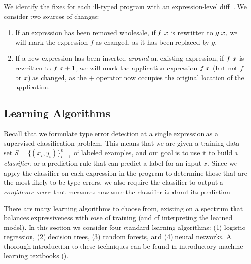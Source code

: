We identify the fixes for each ill-typed program with an
expression-level diff~\citep{Lempsink2009-xf}.
%
We consider two sources of changes:
%
\begin{enumerate}
\item If an expression has been removed wholesale, \eg if $f\ x$
  is rewritten to $g\ x$, we will mark the expression $f$ as
  changed, as it has been replaced by $g$.
\item If a new expression has been inserted \emph{around} an existing
  expression, \eg if $f\ x$ is rewritten to
  $f\ x + 1$, we will mark the application expression
  $f\ x$ (but not $f$ or $x$) as changed, as the $+$ operator now
  occupies the original location of the application.
\end{enumerate}

\subsection{Learning Algorithms}
\label{sec:models}
\lstDeleteShortInline{|} %

Recall that we formulate type error detection at a single expression as a supervised classification problem. This means that we are given a training data set $S = \{ (x_i, y_i) \}_{i=1}^n$ of labeled examples, and our goal is to use it to build a {\em{classifier}}, or a prediction rule that can predict a label for an input $x$. Since we apply the classifier on each expression in the program to determine those that are the most likely to be type errors, we also require the classifier to output a {\em{confidence score}} that measures how sure the classifier is about its prediction. 


%
%

There are many learning algorithms to choose from, existing
on a spectrum that balances expressiveness with ease of training (and of
interpreting the learned model). In this section we consider four standard learning algorithms: (1) logistic regression, (2) decision trees, (3) random forests, and (4) neural networks. A thorough introduction to these techniques can be found in introductory
machine learning textbooks (\eg \cite{FriedmanHastieTibshirani2000}).
%

